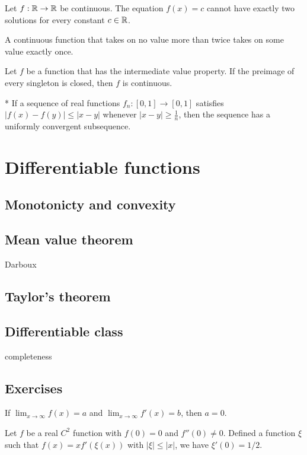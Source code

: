 \documentclass{../note}
\begin{document}
\begin{prb}
Let $f:\mathbb{R}\to\mathbb{R}$ be continuous.
The equation $f(x)=c$ cannot have exactly two solutions for every constant $c\in\mathbb{R}$.
\end{prb}

\begin{prb}
A continuous function that takes on no value more than twice takes on some value exactly once.
\end{prb}

\begin{prb}
Let $f$ be a function that has the intermediate value property.
If the preimage of every singleton is closed, then $f$ is continuous.
\end{prb}

\begin{prb}*
If a sequence of real functions $f_n\colon[0,1]\to[0,1]$ satisfies $|f(x)-f(y)|\le|x-y|$ whenever $|x-y|\ge\frac1n$, then the sequence has a uniformly convergent subsequence.
\end{prb}

\chapter{Differentiable functions}
\section{Monotonicty and convexity}
\section{Mean value theorem}
Darboux
\section{Taylor's theorem}
\section{Differentiable class}
completeness

\section*{Exercises}

\begin{prb}
If $\lim_{x\to\infty}f(x)=a$ and $\lim_{x\to\infty}f'(x)=b$, then $a=0$.
\end{prb}

\begin{prb}
Let $f$ be a real $C^2$ function with $f(0)=0$ and $f''(0)\ne0$.
Defined a function $\xi$ such that $f(x)=xf'(\xi(x))$ with $|\xi|\le|x|$, we have $\xi'(0)=1/2$.
\end{prb}
\end{document}
